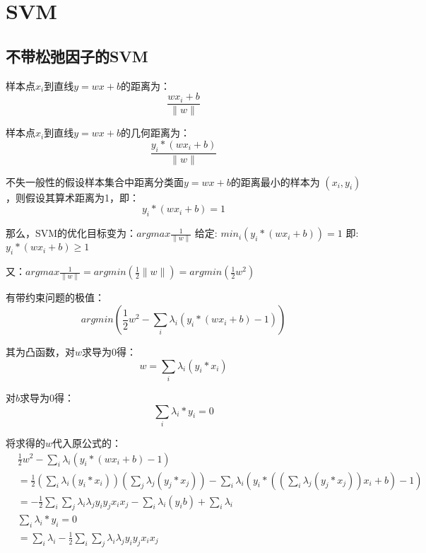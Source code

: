 
\chapter{SVM}

\section{不带松弛因子的SVM}
样本点$x_i$到直线$y=wx+b$的距离为：
\begin{displaymath}
\frac{wx_i+b}{\| w \|}
\end{displaymath}  
 
样本点$x_i$到直线$y=wx+b$的几何距离为：
\begin{displaymath}
\frac{y_i*(wx_i+b)}{\| w \|}
\end{displaymath} 

不失一般性的假设样本集合中距离分类面$y=wx+b$的距离最小的样本为
$(x_i,y_i)$，则假设其算术距离为1，即：
\begin{displaymath}
y_i*(wx_i+b)=1
\end{displaymath} 

那么，SVM的优化目标变为：$argmax{\frac{1}{\|w\|}}$
给定: $min_i(y_i*(wx_i+b)) = 1$
即: $y_i*(wx_i+b) \geq 1$

又：$argmax{\frac{1}{\|w\|}} = argmin(\frac{1}{2}\|w\|) =
argmin(\frac{1}{2}w^2)$

有带约束问题的极值：
\begin{equation}
argmin(\frac{1}{2}w^2 - \sum_i{\lambda_i(y_i*(wx_i+b)-1)})
\end{equation} 

其为凸函数，对$w$求导为0得：
\begin{equation}
w = \sum_i{\lambda_i(y_i*x_i)}
\end{equation} 

对$b$求导为0得：
\begin{equation}
 \sum_i{\lambda_i*y_i}=0
\end{equation}

将求得的$w$代入原公式的：
\begin{equation}
\begin{split}
&\frac{1}{2}w^2 - \sum_i{\lambda_i(y_i*(wx_i+b)-1)}\\
&=\frac{1}{2}(\sum_i{\lambda_i(y_i*x_i)})(\sum_j{\lambda_j(y_j*x_j)}) -
\sum_i{\lambda_i(y_i*((\sum_i{\lambda_j(y_j*x_j)})x_i+b)-1)}\\
&=-\frac{1}{2}\sum_i\sum_j{\lambda_i\lambda_jy_iy_jx_ix_j}
-\sum_i{\lambda_i(y_ib)}+\sum_i{\lambda_i}\\
&\sum_i{\lambda_i*y_i}=0\\
&=\sum_i{\lambda_i}-\frac{1}{2}\sum_i\sum_j{\lambda_i\lambda_jy_iy_jx_ix_j}
\end{split}
\end{equation}

